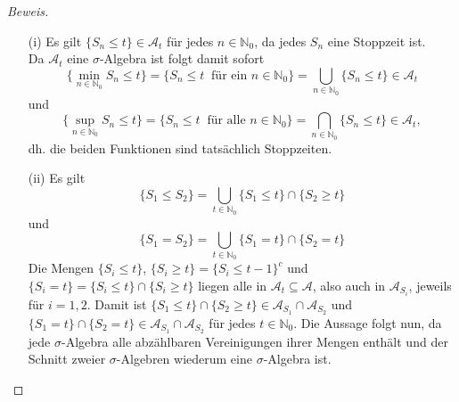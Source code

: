 \documentclass[10pt]{article}
\begin{document}
\begin{proof}[Beweis]  
\begin{itemize}
	\item[(i)] Es gilt $\{S_n \leq t\} \in \mathcal{A}_t$ für jedes $n \in \mathbb{N}_0$, da jedes $S_n$ eine Stoppzeit ist. \\
	Da $\mathcal{A}_t$ eine $\sigma$-Algebra ist folgt damit sofort
	$$
	\{\min_{n \in \mathbb{N}_0} S_n \leq t\} = \{S_n \leq t \;\; \text{für ein } n \in \mathbb{N}_0 \} = \bigcup_{n \in \mathbb{N}_0} \{S_n \leq t\} \in \mathcal{A}_t
	$$
	und
	$$
	\{\sup_{n \in \mathbb{N}_0} S_n \leq t\} = \{S_n \leq t \;\; \text{für alle }  n \in \mathbb{N}_0 \} = \bigcap_{n \in \mathbb{N}_0} \{S_n \leq t\} \in \mathcal{A}_t,
	$$
	dh. die beiden Funktionen sind tatsächlich Stoppzeiten.
	\item[(ii)] Es gilt
	$$
	\{S_1 \leq S_2\} = \bigcup_{t \in \mathbb{N}_0} \{S_1 \leq t\} \cap  \{S_2 \geq t\} 
	$$
	und 
	$$
	\{S_1 = S_2\} = \bigcup_{t \in \mathbb{N}_0} \{S_1 = t\} \cap  \{S_2 = t\} 
	$$
	Die Mengen $\{S_i \leq t\}$, $\{S_i \geq t\} = \{S_i \leq t-1\}^c$ und $\{S_i = t\} = \{S_i \leq t\} \cap \{S_i \geq t\}$ liegen alle in $\mathcal{A}_t \subseteq \mathcal{A}$, also auch in $\mathcal{A}_{S_i}$, jeweils für $i = 1,2$.
	Damit ist $\{S_1 \leq t\} \cap  \{S_2 \geq t\} \in \mathcal{A}_{S_1} \cap \mathcal{A}_{S_2}$ und $\{S_1 = t\} \cap  \{S_2 = t\} \in \mathcal{A}_{S_1} \cap \mathcal{A}_{S_2}$ für jedes $t \in \mathbb{N}_0$. 
	Die Aussage folgt nun, da jede $\sigma$-Algebra alle abzählbaren Vereinigungen ihrer Mengen enthält und der Schnitt zweier $\sigma$-Algebren wiederum eine $\sigma$-Algebra ist.
\end{itemize}
\end{proof}
\end{document}
